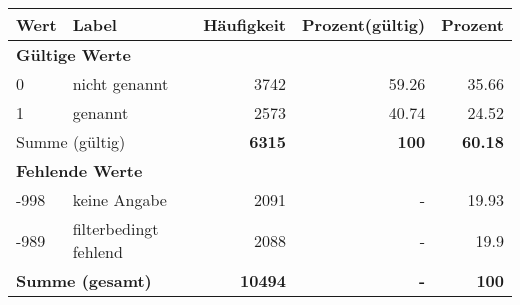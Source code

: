      \begin{longtable}{lXrrr}
     \toprule
     \textbf{Wert} & \textbf{Label} & \textbf{Häufigkeit} & \textbf{Prozent(gültig)} & \textbf{Prozent} \\
     \endhead
     \midrule
     \multicolumn{5}{l}{\textbf{Gültige Werte}}\\

     0 &
     \multicolumn{1}{X}{ nicht genannt   } &


       \num{3742} &
       \num[round-mode=places,round-precision=2]{59.26} &
         \num[round-mode=places,round-precision=2]{35.66} \\

     1 &
     \multicolumn{1}{X}{ genannt   } &


       \num{2573} &
       \num[round-mode=places,round-precision=2]{40.74} &
         \num[round-mode=places,round-precision=2]{24.52} \\
     \midrule
     \multicolumn{2}{l}{Summe (gültig)} &
       \textbf{\num{6315}} &
     \textbf{\num{100}} &
       \textbf{\num[round-mode=places,round-precision=2]{60.18}} \\
     \multicolumn{5}{l}{\textbf{Fehlende Werte}}\\
       -998 &
       keine Angabe &
         \num{2091} &
        - &
         \num[round-mode=places,round-precision=2]{19.93} \\
       -989 &
       filterbedingt fehlend &
         \num{2088} &
        - &
         \num[round-mode=places,round-precision=2]{19.9} \\
     \midrule
     \multicolumn{2}{l}{\textbf{Summe (gesamt)}} &
          \textbf{\num{10494}} &
        \textbf{-} &
        \textbf{\num{100}} \\
     \bottomrule
     \end{longtable}
     
